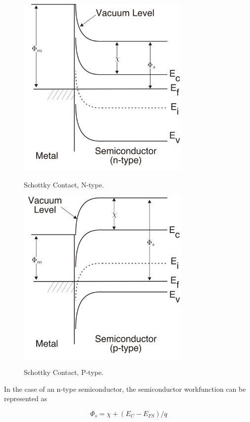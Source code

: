 \begin{figure}[ht]
  \centering
  \scalebox{1.0}
  {\includegraphics[width=3.300in,height= 3.500in]{schottky_bands}}
  \caption[Schottky Contact, N-type]{Schottky Contact, N-type. 
   \label{figSchottkyContactN}}
\end{figure}

\begin{figure}[ht]
  \centering
  \scalebox{1.0}
  {\includegraphics[width=3.300in,height= 3.400in]{schottky_bands_p}}
  \caption[Schottky Contact, P-type]{Schottky Contact, P-type. 
   \label{figSchottkyContactP}}
  
\end{figure}


In the case of an n-type semiconductor, the semiconductor workfunction can
be represented as

\begin{equation}
  \Phi_{s} = \chi + (E_{C}- E_{FS})/q
\end{equation}

